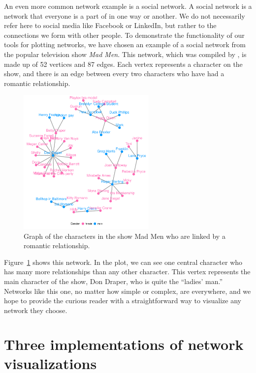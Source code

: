 An even more common network example is a social network. A social network is a network that everyone is a part of in one way or another. We do not necessarily refer here to social media like Facebook or LinkedIn, but rather to the connections we form with other people. To demonstrate the functionality of our tools for plotting networks, we have chosen an example of a social network from the popular television show \emph{Mad Men}. This network, which was compiled by \citet{madmen}, is made up of 52 vertices and 87 edges. Each vertex represents a character on the show, and there is an edge between every two characters who have had a romantic relationship.

\begin{figure}[hbtp]
\centering

\includegraphics[width=0.6\textwidth]{figure/madmen_geom_net-1.pdf}
\caption{\label{fig.cap:madmen} Graph of the characters in the show Mad Men who are linked by a romantic relationship. }
\end{figure}

Figure~\ref{fig.cap:madmen} shows this network. In the plot, we can see one central character who has many more relationships than any other character. This vertex represents the main character of the show, Don Draper, who is quite the ``ladies' man.'' Networks like this one, no matter how simple or complex, are everywhere, and we hope to provide the curious reader with a straightforward way to visualize any network they choose.


%
\section{Three implementations of network visualizations}%
\label{sec:implementations}
%


